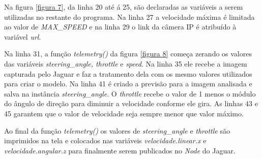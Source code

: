 Na figura \ref{figura 7}, da linha 20 até á 25, são declaradas as variáveis a serem utilizadas no restante do programa. Na linha 27 a velocidade máxima é limitada ao valor de \textit{MAX\_SPEED} e na linha 29 o link da câmera IP é atribuído à variável \textit{url}.
\begin{figure}[H]
	\centering
\end{figure}

Na linha 31, a função \textit{telemetry()} da figura \ref{figura 8} começa zerando os valores das variáveis \textit{steering\_angle, throttle} e \textit{speed}. Na linha 35 ele recebe a imagem capturada pelo Jaguar e faz a tratamento dela com os mesmo valores utilizados para criar o modelo. Na linha 41 é criado a previsão para a imagem analisada e salva na instância \textit{steering\_angle}. O \textit{throttle} recebe o valor de 1 menos o módulo do ângulo de direção para diminuir a velocidade conforme ele gira. As linhas 43 e 45 garantem que o valor de velocidade seja sempre menor que valor máximo.

Ao final da função \textit{telemetry()} os valores de \textit{steering\_angle} e \textit{throttle} são imprimidos na tela e colocados nas variáveis \textit{velocidade.linear.x} e \textit{velocidade.angular.z} para finalmente serem publicados no  \textit{Node} do Jaguar.

\begin{figure}[H]
	\centering
\end{figure}

